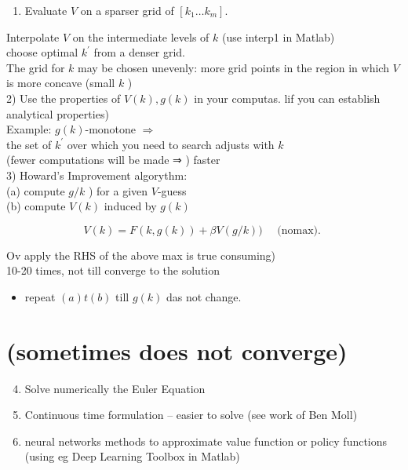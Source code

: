 \documentclass[10pt]{article}
\begin{document}
\begin{enumerate}
  \item Evaluate $V$ on a sparser grid of $\left[k_{1} \ldots k_{m}\right]$.
\end{enumerate}

Interpolate $V$ on the intermediate levels of $k$ (use interp1 in Matlab)\\
choose optimal $k^{\prime}$ from a denser grid.\\
The grid for $k$ may be chosen unevenly: more grid points in the region in which $V$ is more concave (small $k$ )\\
2) Use the properties of $V(k), g(k)$ in your computas. lif you can establish analytical properties)\\
Example: $g(k)$-monotone $\Rightarrow$\\
the set of $k^{\prime}$ over which you need to search adjusts with $k$\\
(fewer computations will be made ⇒ ) faster\\
3) Howard's Improvement algorythm:\\
(a) compute $g / k$ ) for a given $V$-guess\\
(b) compute $V(k)$ induced by $g(k)$

$$
V(k)=F(k, g(k))+\beta V(g / k)) \quad \text { (nomax). }
$$

Ov apply the RHS of the above max is true consuming)\\
10-20 times, not till converge to the solution

\begin{itemize}
  \item repeat $(a) t(b)$ till $g(k)$ das not change.
\end{itemize}

\section*{(sometimes does not converge)}
\begin{enumerate}
  \setcounter{enumi}{3}
  \item Solve numerically the Euler Equation
  \item Continuous time formulation -- easier to solve (see work of Ben Moll)
  \item neural networks methods to approximate value function or policy functions (using eg Deep Learning Toolbox in Matlab)
\end{enumerate}
\end{document}

